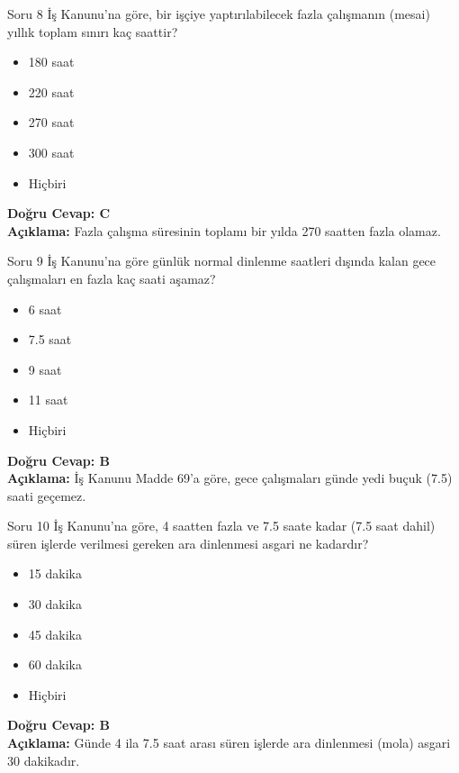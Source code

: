 \documentclass[12pt,a4paper]{article}
\begin{document}
\begin{testcard}{Soru 8}
    İş Kanunu'na göre, bir işçiye yaptırılabilecek fazla çalışmanın (mesai) yıllık toplam sınırı kaç saattir?
    \begin{itemize}
        \item[A)] 180 saat
        \item[B)] 220 saat
        \item[C)] 270 saat
        \item[D)] 300 saat
        \item[E)] Hiçbiri
    \end{itemize}
    \tcblower
    \textbf{Doğru Cevap: C} \\
    \textbf{Açıklama:} Fazla çalışma süresinin toplamı bir yılda 270 saatten fazla olamaz.
\end{testcard}

\begin{testcard}{Soru 9}
    İş Kanunu'na göre günlük normal dinlenme saatleri dışında kalan gece çalışmaları en fazla kaç saati aşamaz?
    \begin{itemize}
        \item[A)] 6 saat
        \item[B)] 7.5 saat
        \item[C)] 9 saat
        \item[D)] 11 saat
        \item[E)] Hiçbiri
    \end{itemize}
    \tcblower
    \textbf{Doğru Cevap: B} \\
    \textbf{Açıklama:} İş Kanunu Madde 69'a göre, gece çalışmaları günde yedi buçuk (7.5) saati geçemez.
\end{testcard}

\begin{testcard}{Soru 10}
    İş Kanunu'na göre, 4 saatten fazla ve 7.5 saate kadar (7.5 saat dahil) süren işlerde verilmesi gereken ara dinlenmesi asgari ne kadardır?
    \begin{itemize}
        \item[A)] 15 dakika
        \item[B)] 30 dakika
        \item[C)] 45 dakika
        \item[D)] 60 dakika
        \item[E)] Hiçbiri
    \end{itemize}
    \tcblower
    \textbf{Doğru Cevap: B} \\
    \textbf{Açıklama:} Günde 4 ila 7.5 saat arası süren işlerde ara dinlenmesi (mola) asgari 30 dakikadır.
\end{testcard}
\end{document}

